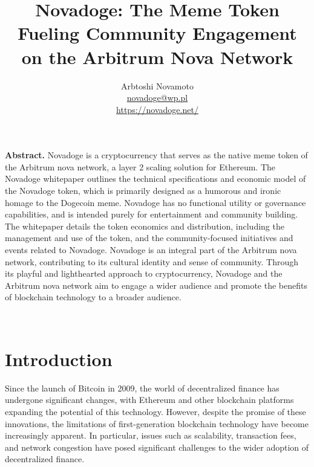 \documentclass[a4paper, 10pt]{article}
\begin{document}
\renewcommand{\abstractname}{\vspace{-\baselineskip}}

\title{Novadoge: The Meme Token Fueling Community Engagement on the Arbitrum Nova Network}
\author{Arbtoshi Novamoto \\ 
\href{novadoge@wp.pl}{novadoge@wp.pl}\\ \url{https://novadoge.net/}}
\date{}


\maketitle
\begin{center}
\parbox{0.8\linewidth}{\noindent \textbf{Abstract.} Novadoge is a cryptocurrency that serves as the native meme token of the Arbitrum nova network, a layer 2 scaling solution for Ethereum. The Novadoge whitepaper outlines the technical specifications and economic model of the Novadoge token, which is primarily designed as a humorous and ironic homage to the Dogecoin meme. Novadoge has no functional utility or governance capabilities, and is intended purely for entertainment and community building. The whitepaper details the token economics and distribution, including the management and use of the token, and the community-focused initiatives and events related to Novadoge. Novadoge is an integral part of the Arbitrum nova network, contributing to its cultural identity and sense of community. Through its playful and lighthearted approach to cryptocurrency, Novadoge and the Arbitrum nova network aim to engage a wider audience and promote the benefits of blockchain technology to a broader audience.}
\end{center}

\

\section{Introduction}\label{introduction}

Since the launch of Bitcoin in 2009, the world of decentralized finance has undergone significant changes, with Ethereum and other blockchain platforms expanding the potential of this technology. However, despite the promise of these innovations, the limitations of first-generation blockchain technology have become increasingly apparent. In particular, issues such as scalability, transaction fees, and network congestion have posed significant challenges to the wider adoption of decentralized finance.
\end{document}
